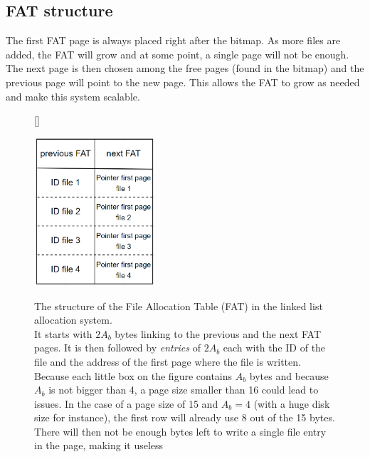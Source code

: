 \documentclass[10pt,a4paper]{ULBreport}
\begin{document}
\subsection{FAT structure}
The first FAT page is always placed right after the bitmap. As more files are added, the FAT will grow and at some point, a single page will not be enough. The next page is then chosen among the free pages (found in the bitmap) and the previous page will point to the new page. This allows the FAT to grow as needed and make this system scalable. 
\begin{figure}[H]
    [\FBwidth]
    {\caption{The structure of the File Allocation Table (FAT) in the linked list allocation system.\\ It starts with $2 A_b$ bytes linking to the previous and the next FAT pages. It is then followed by \textit{entries} of $2 A_b$ each with the ID of the file and the address of the first page where the file is written.\\ Because each little box on the figure contains $A_b$ bytes and because $A_b$ is not bigger than 4, a page size smaller than 16 could lead to issues. In the case of a page size of 15 and $A_b = 4$ (with a huge disk size for instance), the first row will already use 8 out of the 15 bytes. There will then not be enough bytes left to write a single file entry in the page, making it useless}\label{fig:FAT_LL}}
    {\includegraphics[width=0.4\textwidth]{FAT_LL.png}}
\end{figure}
\end{document}
